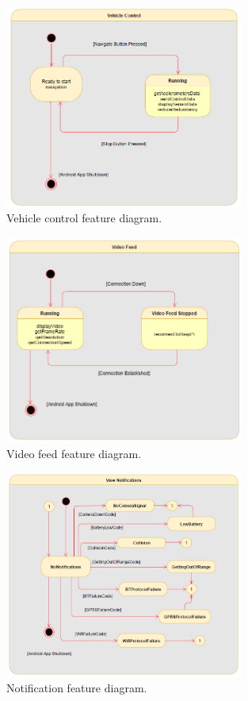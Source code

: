 %
\begin{figure}[!ht]
\centering
\includegraphics[width=0.7\textwidth]{img/vehicle_control_sm.png}
\caption{\label{fig:vehicle_control_diagram}Vehicle control feature diagram.}
\end{figure}
%
\begin{figure}[!ht]
\centering
\includegraphics[width=0.7\textwidth]{img/video_feed_sm.png}
\caption{\label{fig:video_feed_diagram}Video feed feature diagram.}
\end{figure}
%
\begin{figure}[!ht]
\centering
\includegraphics[width=0.7\textwidth]{img/notification_sm.png}
\caption{\label{fig:notification_diagram}Notification feature diagram.}
\end{figure}
%